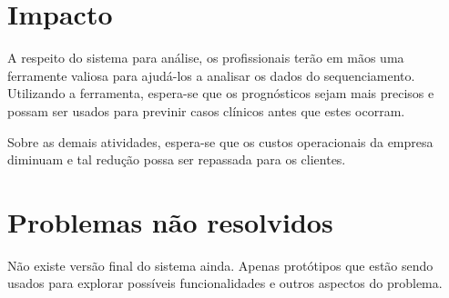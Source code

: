 %

\section{Impacto}

A respeito do sistema para análise, os profissionais terão em mãos uma ferramente valiosa para ajudá-los a analisar os dados
do sequenciamento. Utilizando a ferramenta, espera-se que os prognósticos sejam mais precisos e possam ser usados para
previnir casos clínicos antes que estes ocorram.

Sobre as demais atividades, espera-se que os custos operacionais da empresa diminuam e tal redução possa ser repassada para os clientes.





\section{Problemas não resolvidos}

Não existe versão final do sistema ainda. Apenas protótipos que estão sendo usados para explorar possíveis funcionalidades e outros aspectos do problema.
